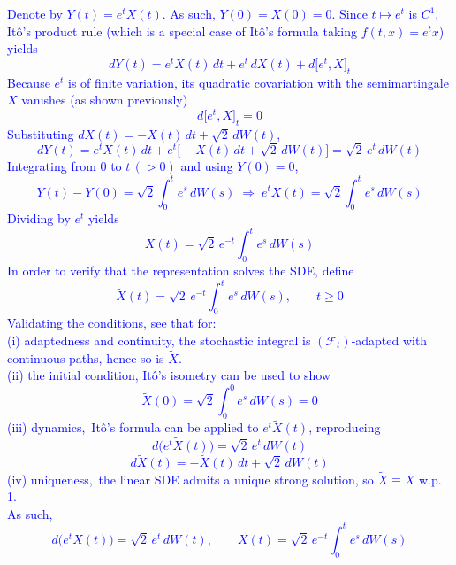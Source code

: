 \documentclass{article}
\begin{document}
\textcolor{blue}{
Denote by $Y(t)=e^{t}X(t)$. As such, $Y(0)=X(0)=0$.  Since $t\mapsto e^{t}$ is $C^{1}$, Itô’s product rule (which is a special case of Itô’s formula taking $f(t,x)=e^{t}x$) yields
$$
dY(t)=e^{t}X(t)\,dt+e^{t}\,dX(t)+d\bigl[e^{t},X\bigr]_t
$$
Because $e^{t}$ is of finite variation, its quadratic covariation with the semimartingale $X$ vanishes (as shown previously)
$$
d\bigl[e^{t},X\bigr]_t=0
$$
Substituting $dX(t)=-X(t)\,dt+\sqrt{2}\,dW(t)$,
$$
dY(t)=e^{t}X(t)\,dt+e^{t}\bigl[-X(t)\,dt+\sqrt{2}\,dW(t)\bigr]
      =\sqrt{2}\,e^{t}\,dW(t)
$$
Integrating from $0$ to $t\,(>0)$ and using $Y(0)=0$,
$$
Y(t)-Y(0)=\sqrt{2}\int_{0}^{t}e^{s}\,dW(s)\;\Longrightarrow\;
e^{t}X(t)=\sqrt{2}\int_{0}^{t}e^{s}\,dW(s)
$$
Dividing by $e^{t}$ yields
$$
X(t)=\sqrt{2}\,e^{-t}\int_{0}^{t}e^{s}\,dW(s)
$$
In order to verify that the representation solves the SDE, define
$$
\widetilde{X}(t)=\sqrt{2}\,e^{-t}\int_{0}^{t}e^{s}\,dW(s),\qquad t\ge0
$$
Validating the conditions, see that for: \\
(i) adaptedness and continuity, the stochastic integral is $(\mathcal F_t)$‑adapted with continuous paths, hence so is $\widetilde{X}$.   \\
(ii) the initial condition, Itô's isometry can be used to show
$$
\widetilde{X}(0)=\sqrt{2}\int_{0}^{0}e^{s}\,dW(s)=0
$$
(iii) dynamics, Itô’s formula can be applied to $e^{t}\widetilde{X}(t)$, reproducing
$$
d\!\bigl(e^{t}\widetilde{X}(t)\bigr)=\sqrt{2}\,e^{t}\,dW(t)
$$
$$
d\widetilde{X}(t)=-\widetilde{X}(t)\,dt+\sqrt{2}\,dW(t)
$$
(iv) uniqueness, the linear SDE admits a unique strong solution, so $\widetilde{X}\equiv X$ w.p. 1.   \\
As such,
$$d\!\bigl(e^{t}X(t)\bigr)=\sqrt{2}\,e^{t}\,dW(t),\qquad
  X(t)=\sqrt{2}\,e^{-t}\int_{0}^{t}e^{s}\,dW(s) $$
}
\end{document}
